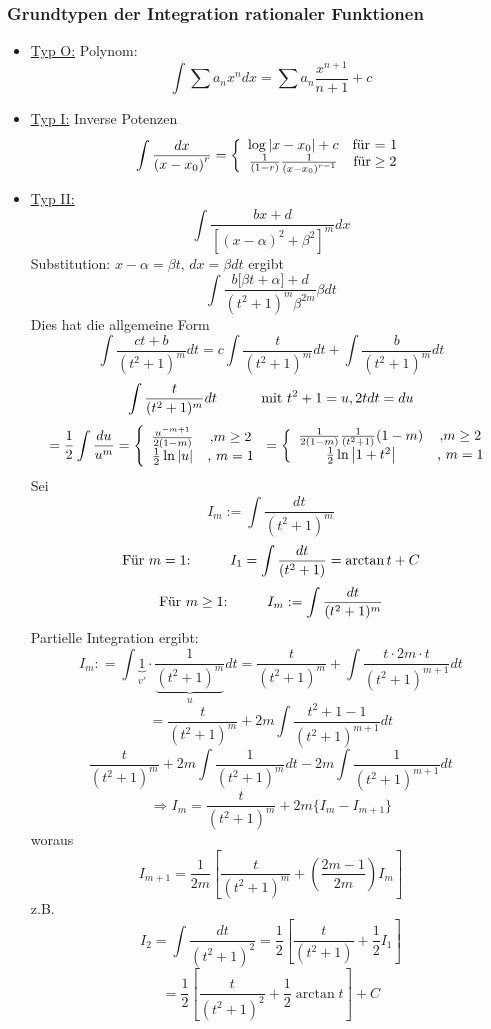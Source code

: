 \subsubsection*{Grundtypen der Integration rationaler Funktionen}
\begin{itemize}
\item \underline{Typ O:} Polynom:$$\int \sum a_{n}x^{n}dx=\sum a_{n}\dfrac {x^{n+1}}{n+1}+c$$
\item \underline{Typ I:} Inverse Potenzen \[\int {\frac{{dx}}{{(x - {x_0})}^r}}  = \left\{ {\begin{array}{*{20}{c}}
{\log \left| {x - {x_0}} \right| + c}&{{\text{für = 1}}}\\
{\frac{1}{{(1 - r)}}\frac{1}{{{{(x - {x_0})}^{r - 1}}}}}&{{\text{für}} \ge {\rm{2}}}
\end{array}} \right.\]

\item \underline{Typ II:}
$$\int { \dfrac {bx+d}{\left[ \left( x-\alpha \right) ^{2}+\beta ^{2}\right] ^{m}}dx}$$
Substitution: $x-\alpha =\beta t$, $dx=\beta dt$ ergibt $$\int {\dfrac {b\lbrack \beta t+\alpha\rbrack +d}{(t^2 +1)^m \beta ^{2m}} \beta dt}$$ Dies hat die allgemeine Form $$\int{\frac{ct+b}{(t^2+1)^m}dt}=c\int{\frac{t}{(t^2 +1)^m}dt}+\int{\frac{b}{(t^2 +1)^m} dt}$$
$$\int{\frac{t}{(t^2 +1)^m}dt}\text{\hspace{10mm} mit }t^2+1=u, 2t dt=du$$
$$=\frac{1}{2}\int{\frac{du}{u^m}} = \left\{ {\begin{array}{*{20}{c}}
{\frac{{{u^{ - m + 1}}}}{{2(1 - m)}}}&{{\rm{, }}m \ge 2}\\
{\frac{1}{2}\ln \left| u \right|}&{\text{, }m = 1}
\end{array}} \right. = \left\{ {\begin{array}{*{20}{c}}
{\frac{1}{{2(1 - m)}}\frac{1}{{({t^2} + 1)}}(1 - m)}&{{\rm{, }}m \ge 2}\\
{\frac{1}{2}\ln \left| {1 + {t^2}} \right|}&{\text{, }m = 1}
\end{array}} \right.$$
Sei 
$$I_m :=\int{\frac{dt}{(t^2 +1)^m}}$$
$$\text{Für $m=1$:\hspace{10mm}}I_1=\int{\frac{dt}{(t^2 +1)}}=\arctan t + C$$
$$\text{Für $m\geq1$:\hspace{10mm}}I_m:=\int{\frac{dt}{(t^2 +1)^m}}$$
Partielle Integration ergibt:
\[{I_m}: = \int {\underbrace 1_{v'} \cdot \frac{1}{{\underbrace {{{({t^2} + 1)}^m}}_u}}dt}  = \frac{t}{{{{({t^2} + 1)}^m}}} + \int {\frac{{t \cdot 2m \cdot t}}{{{{({t^2} + 1)}^{m + 1}}}}dt} \]
$$=\frac{t}{(t^2 +1)^m} + 2m\int{\frac{t^2 +1-1}{(t^2 +1)^{m+1}}dt}$$
$$\frac{t}{(t^2 +1)^m}+2m\int{\frac{1}{(t^2 +1)^m}dt}-2m\int{\frac{1}{(t^2 +1)^{m+1}}dt}$$
$$\Rightarrow I_m=\frac{t}{(t^2 +1)^m}+2m\{ I_m - I_{m+1} \}$$
woraus $$I_{m+1}=\frac{1}{2m}\left[\frac{t}{(t^2 +1)^m} + \left(\frac{2m-1}{2m}\right)I_m\right]$$
z.B.$$I_2=\int{\frac{dt}{(t^2 +1)^2}}=\frac{1}{2}\left[ \frac{t}{(t^2 +1)}+\frac{1}{2}I_1\right]$$
$$=\frac{1}{2}\left[ \frac{t}{(t^2 +1)^2}+\frac{1}{2}\arctan t\right] + C$$
\end{itemize}
